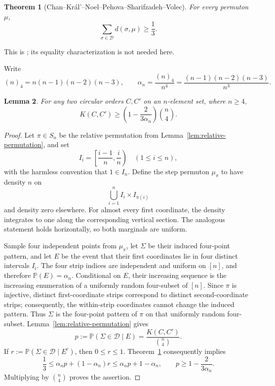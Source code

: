\documentclass[a4paper]{amsart}
\newtheorem{theorem}{Theorem}[section]
\newtheorem{lemma}[theorem]{Lemma}
\theoremstyle{remark}
\newcommand{\Prb}{\mathbb P}
\newcommand{\Dih}{\mathcal D}
\begin{document}
\begin{theorem}[Chan--Kr\'al'--Noel--Pehova--Sharifzadeh--Volec]
\label{thm:permuton}
For every permuton $\mu$,
\[
 \sum_{\sigma\in\Dih}d(\sigma,\mu)\ge\frac13.
\]
\end{theorem}

This is \cite[Theorem~7]{ChanEtAl}; its equality characterization is
not needed here.

Write
\[
 (n)_4=n(n-1)(n-2)(n-3),
 \qquad
 \alpha_n=\frac{(n)_4}{n^4}
 =\frac{(n-1)(n-2)(n-3)}{n^3}.
\]

\begin{lemma}\label{lem:circular-bound}
For any two circular orders $C,C'$ on an $n$-element set, where
$n\ge4$,
\[
 K(C,C')
 \ge
 \left(1-\frac{2}{3\alpha_n}\right)\binom n4.
\]
\end{lemma}

\begin{proof}
Let $\pi\in S_n$ be the relative permutation from
Lemma~\ref{lem:relative-permutation}, and set
\[
 I_i=\left[\frac{i-1}{n},\frac{i}{n}\right)
 \quad (1\le i\le n),
\]
with the harmless convention that $1\in I_n$. Define the step
permuton $\mu_\pi$ to have density $n$ on
\[
 \bigcup_{i=1}^n I_i\times I_{\pi(i)}
\]
and density zero elsewhere. For almost every first coordinate, the
density integrates to one along the corresponding vertical section.
The analogous statement holds horizontally, so both marginals are
uniform.

Sample four independent points from $\mu_\pi$, let $\Sigma$ be
their induced four-point pattern, and let $E$ be the event that their
first coordinates lie in four distinct intervals $I_i$. The four
strip indices are independent and uniform on $[n]$, and therefore
$\Prb(E)=\alpha_n$. Conditional on $E$, their increasing sequence is
the increasing enumeration of a uniformly random four-subset of
$[n]$. Since $\pi$ is injective, distinct first-coordinate strips
correspond to distinct second-coordinate strips; consequently, the
within-strip coordinates cannot change the induced pattern. Thus
$\Sigma$ is the four-point pattern of $\pi$ on that uniformly random
four-subset. Lemma~\ref{lem:relative-permutation} gives
\[
 p:=\Prb(\Sigma\in\Dih\mid E)
   =\frac{K(C,C')}{\binom n4}.
\]
If $r:=\Prb(\Sigma\in\Dih\mid E^c)$, then $0\le r\le1$.
Theorem~\ref{thm:permuton} consequently implies
\[
 \frac13
 \le \alpha_np+(1-\alpha_n)r
 \le \alpha_np+1-\alpha_n,
 \qquad
 p\ge1-\frac{2}{3\alpha_n}.
\]
Multiplying by $\binom n4$ proves the assertion.
\end{proof}
\end{document}
